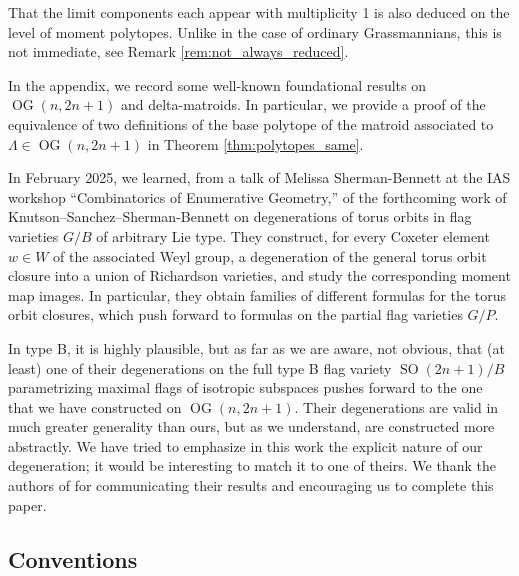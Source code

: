 \documentclass[12pt]{amsart}
\DeclareMathOperator{\OG}{OG}
\DeclareMathOperator{\SO}{SO}
\begin{document}
That the limit components each appear with multiplicity 1 is also deduced on the level of moment polytopes. Unlike in the case of ordinary Grassmannians, this is not immediate, see Remark \ref{rem:not_always_reduced}.

In the appendix, we record some well-known foundational results on $\OG(n,2n+1)$ and delta-matroids. In particular, we provide a proof of the equivalence of two definitions of the base polytope of the matroid associated to $\Lambda\in\OG(n,2n+1)$ in Theorem \ref{thm:polytopes_same}. 

In February 2025, we learned, from a talk of Melissa Sherman-Bennett at the IAS workshop ``Combinatorics of Enumerative Geometry,'' of the forthcoming work of Knutson--Sanchez--Sherman-Bennett \cite{kssb} on degenerations of torus orbits in flag varieties $G/B$ of arbitrary Lie type. They construct, for every Coxeter element $w\in W$ of the associated Weyl group, a degeneration of the general torus orbit closure into a union of Richardson varieties, and study the corresponding moment map images. In particular, they obtain families of different formulas for the torus orbit closures, which push forward to formulas on the partial flag varieties $G/P$.

In type B, it is highly plausible, but as far as we are aware, not obvious, that (at least) one of their degenerations on the full type B flag variety $\SO(2n+1)/B$ parametrizing maximal flags of isotropic subspaces pushes forward to the one that we have constructed on $\OG(n,2n+1)$. Their degenerations are valid in much greater generality than ours, but as we understand, are constructed more abstractly. We have tried to emphasize in this work the explicit nature of our degeneration; it would be interesting to match it to one of theirs. We thank the authors of \cite{kssb} for communicating their results and encouraging us to complete this paper.

\subsection{Conventions}\label{sec:conventions}
\end{document}
